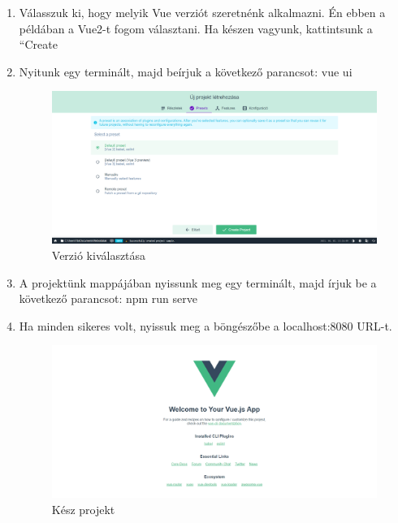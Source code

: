 \begin{enumerate}
  \item Válasszuk ki, hogy melyik Vue verziót szeretnénk alkalmazni. Én ebben a példában a Vue2-t fogom választani. Ha készen vagyunk, kattintsunk a “Create
  \item Nyitunk egy terminált, majd beírjuk a következő parancsot: vue ui
\begin{figure}[h!]
\centering
\includegraphics[width=\textwidth]{images/1617369965789.png}
\caption{Verzió kiválasztása}
\label{fig:ff}
\end{figure}
 \item A projektünk mappájában nyissunk meg egy terminált, majd írjuk be a következő parancsot: npm run serve
 \item Ha minden sikeres volt, nyissuk meg a böngészőbe a localhost:8080 URL-t.
	\begin{figure}[h!]
	\centering
	\includegraphics[width=\textwidth]{images/1617370382875.png}
	\caption{Kész projekt}
	\label{fig:ff}
	\end{figure}
\end{enumerate}

